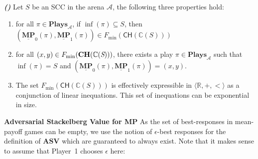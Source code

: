 \begin{lemma}
\label{lemCHToPlay}
\textbf{\emph{(\cite{FGR20})}} Let $S$ be an SCC in the arena $\mathcal{A}$, the following three properties hold:
\begin{enumerate}
    \item for all $\pi \in \mathbf{Plays}_{\mathcal{A}}$, if $\inf(\pi) \subseteq S$, then $(\underline{\mathbf{MP}}_0(\pi), \underline{\mathbf{MP}}_1(\pi)) \in F_{\min}(\mathsf{CH}(\mathbb{C}(S)))$
    \item for all $(x,y) \in F_{\min}(\mathbf{CH}(\mathbb{C}(\emph{S})))$, there exists a play $\pi \in \mathbf{Plays}_{\mathcal{A}}$ such that $\inf(\pi) = S$ and $(\underline{\mathbf{MP}}_0(\pi), \underline{\mathbf{MP}}_1(\pi)) = (x,y)$.
    \item The set $F_{\min}(\mathsf{CH}(\mathbb{C}(S)))$ is effectively expressible in $\langle \mathbb{R}, +, < \rangle$ as a conjunction of linear inequations. This set of inequations can be exponential in size.
\end{enumerate}
\end{lemma}


\noindent\textbf{Adversarial Stackelberg Value for MP} As the set of best-responses in mean-payoff games can be empty, we use the notion of $\epsilon$-best responses for the definition of $\mathbf{ASV}$ which are guaranteed to always exist. Note that it makes sense to assume that Player~1 chooses $\epsilon$ here:
\\


